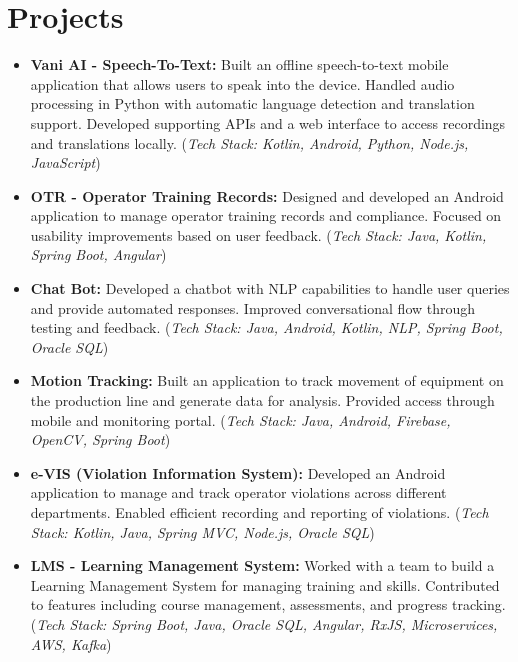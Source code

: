 \documentclass[10pt, a4paper]{article}
\begin{document}
\section*{Projects}
\begin{itemize}[leftmargin=1.5em, itemsep=0.75ex, topsep=0.5ex, label=\textbullet]

    \item \textbf{Vani AI - Speech-To-Text:} Built an offline speech-to-text mobile application that allows users to speak into the device. Handled audio processing in Python with automatic language detection and translation support. Developed supporting APIs and a web interface to access recordings and translations locally. (\textit{Tech Stack: Kotlin, Android, Python, Node.js, JavaScript})

    \item \textbf{OTR - Operator Training Records:} Designed and developed an Android application to manage operator training records and compliance. Focused on usability improvements based on user feedback. (\textit{Tech Stack: Java, Kotlin, Spring Boot, Angular})

    \item \textbf{Chat Bot:} Developed a chatbot with NLP capabilities to handle user queries and provide automated responses. Improved conversational flow through testing and feedback. (\textit{Tech Stack: Java, Android, Kotlin, NLP, Spring Boot, Oracle SQL})

    \item \textbf{Motion Tracking:} Built an application to track movement of equipment on the production line and generate data for analysis. Provided access through mobile and monitoring portal. (\textit{Tech Stack: Java, Android, Firebase, OpenCV, Spring Boot})

    \item \textbf{e-VIS (Violation Information System):} Developed an Android application to manage and track operator violations across different departments. Enabled efficient recording and reporting of violations. (\textit{Tech Stack: Kotlin, Java, Spring MVC, Node.js, Oracle SQL})

    \item \textbf{LMS - Learning Management System:} Worked with a team to build a Learning Management System for managing training and skills. Contributed to features including course management, assessments, and progress tracking. (\textit{Tech Stack: Spring Boot, Java, Oracle SQL, Angular, RxJS, Microservices, AWS, Kafka})


\end{itemize}
\end{document}

